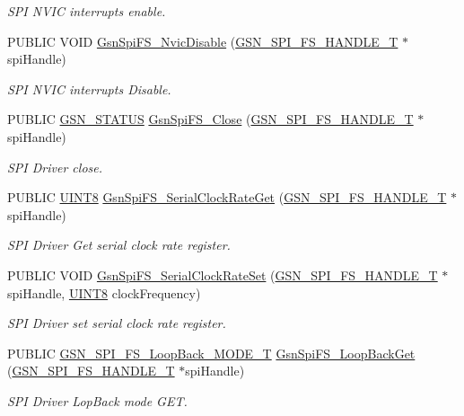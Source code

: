 \begin{DoxyCompactItemize}
\begin{DoxyCompactList}\small\item\em SPI NVIC interrupts enable. \end{DoxyCompactList}\item 
PUBLIC VOID \hyperlink{a00655_ga03fb48e9f6139472b3018cd940fc9b10}{GsnSpiFS\_\-NvicDisable} (\hyperlink{a00234}{GSN\_\-SPI\_\-FS\_\-HANDLE\_\-T} $\ast$spiHandle)
\begin{DoxyCompactList}\small\item\em SPI NVIC interrupts Disable. \end{DoxyCompactList}\item 
PUBLIC \hyperlink{a00660_gada5951904ac6110b1fa95e51a9ddc217}{GSN\_\-STATUS} \hyperlink{a00655_ga9e8a0b280a3bfe80b6c8a2e849632fc6}{GsnSpiFS\_\-Close} (\hyperlink{a00234}{GSN\_\-SPI\_\-FS\_\-HANDLE\_\-T} $\ast$spiHandle)
\begin{DoxyCompactList}\small\item\em SPI Driver close. \end{DoxyCompactList}\item 
PUBLIC \hyperlink{a00660_gab27e9918b538ce9d8ca692479b375b6a}{UINT8} \hyperlink{a00655_ga5bf389dcdb9cb21c451ae9816c6a1aae}{GsnSpiFS\_\-SerialClockRateGet} (\hyperlink{a00234}{GSN\_\-SPI\_\-FS\_\-HANDLE\_\-T} $\ast$spiHandle)
\begin{DoxyCompactList}\small\item\em SPI Driver Get serial clock rate register. \end{DoxyCompactList}\item 
PUBLIC VOID \hyperlink{a00655_ga82e98d4047f21914ae66c23723e5dbdc}{GsnSpiFS\_\-SerialClockRateSet} (\hyperlink{a00234}{GSN\_\-SPI\_\-FS\_\-HANDLE\_\-T} $\ast$spiHandle, \hyperlink{a00660_gab27e9918b538ce9d8ca692479b375b6a}{UINT8} clockFrequency)
\begin{DoxyCompactList}\small\item\em SPI Driver set serial clock rate register. \end{DoxyCompactList}\item 
PUBLIC \hyperlink{a00655_ga721139ec14f269f577231293b4b96dad}{GSN\_\-SPI\_\-FS\_\-LoopBack\_\-MODE\_\-T} \hyperlink{a00655_ga915a936f8beaaa2d94e6e4b560ae9f5f}{GsnSpiFS\_\-LoopBackGet} (\hyperlink{a00234}{GSN\_\-SPI\_\-FS\_\-HANDLE\_\-T} $\ast$spiHandle)
\begin{DoxyCompactList}\small\item\em SPI Driver LopBack mode GET. \end{DoxyCompactList}\item 

\end{DoxyCompactItemize}
